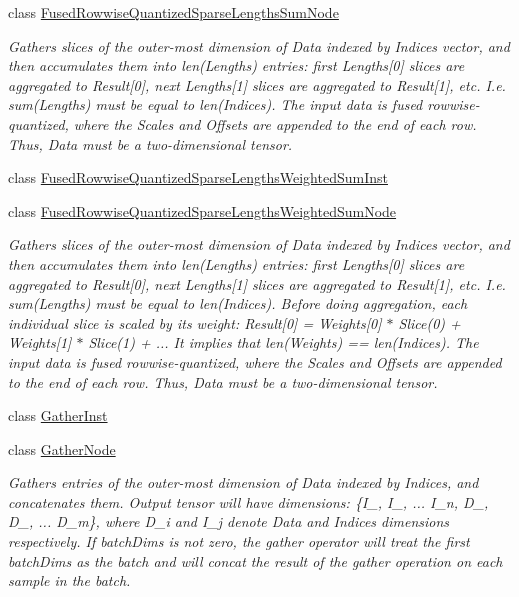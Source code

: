\begin{DoxyCompactItemize}
class \hyperlink{classglow_1_1_fused_rowwise_quantized_sparse_lengths_sum_node}{Fused\+Rowwise\+Quantized\+Sparse\+Lengths\+Sum\+Node}
\begin{DoxyCompactList}\small\item\em Gathers slices of the outer-\/most dimension of Data indexed by Indices vector, and then accumulates them into len(\+Lengths) entries\+: first Lengths\mbox{[}0\mbox{]} slices are aggregated to Result\mbox{[}0\mbox{]}, next Lengths\mbox{[}1\mbox{]} slices are aggregated to Result\mbox{[}1\mbox{]}, etc. I.\+e. sum(\+Lengths) must be equal to len(\+Indices). The input data is fused rowwise-\/quantized, where the Scales and Offsets are appended to the end of each row. Thus, Data must be a two-\/dimensional tensor. \end{DoxyCompactList}\item 
class \hyperlink{classglow_1_1_fused_rowwise_quantized_sparse_lengths_weighted_sum_inst}{Fused\+Rowwise\+Quantized\+Sparse\+Lengths\+Weighted\+Sum\+Inst}
\item 
class \hyperlink{classglow_1_1_fused_rowwise_quantized_sparse_lengths_weighted_sum_node}{Fused\+Rowwise\+Quantized\+Sparse\+Lengths\+Weighted\+Sum\+Node}
\begin{DoxyCompactList}\small\item\em Gathers slices of the outer-\/most dimension of Data indexed by Indices vector, and then accumulates them into len(\+Lengths) entries\+: first Lengths\mbox{[}0\mbox{]} slices are aggregated to Result\mbox{[}0\mbox{]}, next Lengths\mbox{[}1\mbox{]} slices are aggregated to Result\mbox{[}1\mbox{]}, etc. I.\+e. sum(\+Lengths) must be equal to len(\+Indices). Before doing aggregation, each individual slice is scaled by its weight\+: Result\mbox{[}0\mbox{]} = Weights\mbox{[}0\mbox{]} $\ast$ Slice(0) + Weights\mbox{[}1\mbox{]} $\ast$ Slice(1) + ... It implies that len(\+Weights) == len(\+Indices). The input data is fused rowwise-\/quantized, where the Scales and Offsets are appended to the end of each row. Thus, Data must be a two-\/dimensional tensor. \end{DoxyCompactList}\item 
class \hyperlink{classglow_1_1_gather_inst}{Gather\+Inst}
\item 
class \hyperlink{classglow_1_1_gather_node}{Gather\+Node}
\begin{DoxyCompactList}\small\item\em Gathers entries of the outer-\/most dimension of Data indexed by Indices, and concatenates them. Output tensor will have dimensions\+: \{I\+\_, I\+\_, ... I\+\_\+n, D\+\_, D\+\_, ... D\+\_\+m\}, where D\+\_\+i and I\+\_\+j denote Data and Indices dimensions respectively. If batch\+Dims is not zero, the gather operator will treat the first batch\+Dims as the batch and will concat the result of the gather operation on each sample in the batch. \end{DoxyCompactList}\item 

\end{DoxyCompactItemize}
